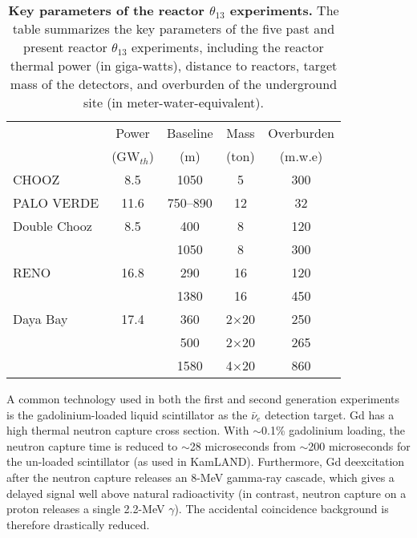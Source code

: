 \documentclass[aps,twocolumn,preprintnumbers,amsmath,superscriptaddress,amssymb,floats,nofootinbib]{revtex4-1}
\begin{document}
\begin{table}[tb]
  \begin{tabular}{lcccc}
  \hline
  & Power & Baseline & Mass & Overburden \\
  & (GW$_{th}$) & (m) & (ton) & (m.w.e)    \\
  \hline
  CHOOZ        & 8.5  & 1050  & 5    & 300\\
  PALO VERDE   & 11.6 & 750--890  & 12  & 32\\
  \hline
  Double Chooz & 8.5  & 400  & 8  & 120\\
               &      & 1050 & 8  & 300\\
  RENO         & 16.8 & 290  & 16   & 120\\
               &      & 1380 & 16   & 450\\
  Daya Bay     & 17.4 & 360  & 2$\times$20   & 250\\
               &      & 500  & 2$\times$20   & 265\\
               &      & 1580 & 4$\times$20   & 860\\
  \hline
  \end{tabular}
  \caption{{\bf Key parameters of the reactor $\theta_{13}$ experiments.} The table summarizes the key parameters of the five past and present reactor $\theta_{13}$ experiments, including the reactor thermal power (in giga-watts), distance to reactors, target mass of the detectors, and overburden of the underground site (in meter-water-equivalent).}
\label{tab:theta13}
\end{table}

A common technology used in both the first and second generation experiments is the gadolinium-loaded liquid scintillator as the $\bar\nu_{e}$ detection target. 
Gd has a high thermal neutron capture cross section. With $\sim$0.1\% gadolinium loading, the neutron capture time is reduced to $\sim$28 microseconds from $\sim$200 microseconds for the un-loaded scintillator (as used in KamLAND). 
Furthermore, Gd deexcitation after the neutron capture releases an 8-MeV gamma-ray cascade, which gives a delayed signal well above natural radioactivity (in contrast, 
neutron capture on a proton releases a single 2.2-MeV $\gamma$). The accidental coincidence background is therefore drastically reduced.
\end{document}
